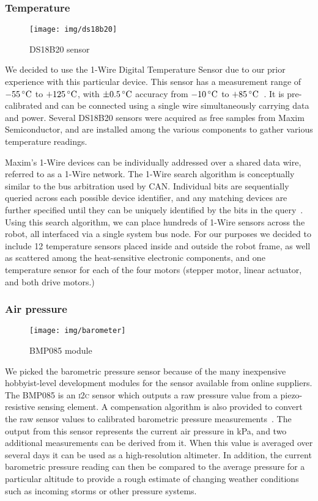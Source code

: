     \subsubsection*{Temperature}
    \begin{wrapfigure}{l}{0.17\textwidth}
        \centering
        \texttt{[image: img/ds18b20]}
        \caption*{DS18B20 sensor}
    \end{wrapfigure}
    We decided to use the  1-Wire Digital Temperature Sensor due to our prior experience with this particular device. This sensor has a measurement range of $-55\,^{\circ}\mathrm{C}{}$ to $+125\,^{\circ}\mathrm{C}{}$, with $\pm0.5\,^{\circ}\mathrm{C}{}$ accuracy from $-10\,^{\circ}\mathrm{C}{}$ to $+85\,^{\circ}\mathrm{C}{}$~\cite{ds18b20}. It is pre-calibrated and can be connected using a single wire simultaneously carrying data and power. Several DS18B20 sensors were acquired as free samples from Maxim Semiconductor, and are installed among the various components to gather various temperature readings.

    Maxim's 1-Wire devices can be individually addressed over a shared data wire, referred to as a 1-Wire network. The 1-Wire search algorithm is conceptually similar to the bus arbitration used by CAN. Individual bits are sequentially queried across each possible device identifier, and any matching devices are further specified until they can be uniquely identified by the bits in the query~\cite{1wiresearch}. Using this search algorithm, we can place hundreds of 1-Wire sensors across the robot, all interfaced via a single system bus node. For our purposes we decided to include 12 temperature sensors placed inside and outside the robot frame, as well as scattered among the heat-sensitive electronic components, and one temperature sensor for each of the four motors (stepper motor, linear actuator, and both drive motors.)

    \subsubsection*{Air pressure}
    \begin{wrapfigure}{l}{0.2\textwidth}
        \centering
        \texttt{[image: img/barometer]}
        \caption*{BMP085 module}
    \end{wrapfigure}
    We picked the  barometric pressure sensor because of the many inexpensive hobbyist-level development modules for the sensor available from online suppliers. The BMP085 is an \textsc{i2c} sensor which outputs a raw pressure value from a piezo-resistive sensing element. A compensation algorithm is also provided to convert the raw sensor values to calibrated barometric pressure measurements~\cite{bmp085}. The output from this sensor represents the current air pressure in kPa, and two additional measurements can be derived from it. When this value is averaged over several days it can be used as a high-resolution altimeter. In addition, the current barometric pressure reading can then be compared to the average pressure for a particular altitude to provide a rough estimate of changing weather conditions such as incoming storms or other pressure systems.

